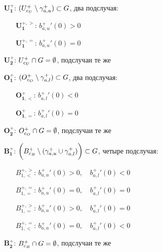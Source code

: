 \begin{enumerate}
    \item[$ \bm{U_1^+} $:] $ (U_{c_U}^+ \setminus \gamma_{a, u}^+) \subset G $, два подслучая:
    \begin{enumerate}
        \item[$ \bm{U_1^{+, >}} $:] $ b_{a, u}^+{}'(0) > 0 $
        \item[$ \bm{U_1^{+, =}} $:] $ b_{a, u}^+{}'(0) = 0 $
    \end{enumerate}
    \item[$ \bm{U_2^+} $:] $ U_{c_U}^+ \cap G = \emptyset $, подслучаи те же
    \item[$ \bm{O_1^+} $:] $ (O_{c_O}^+ \setminus \gamma_{a, l}^+) \subset G $, два подслучая:
    \begin{enumerate}
        \item[$ \bm{O_{1, <}^+} $:] $ b_{a, l}^+{}'(0) < 0 $
        \item[$ \bm{O_{1, =}^+} $:] $ b_{a, l}^+{}'(0) = 0 $
    \end{enumerate}
    \item[$ \bm{O_2^+} $:] $ O_{c_O}^+ \cap G = \emptyset $, подслучаи те же
    \item[$ \bm{B_1^+} $:] $ \bigg(B_{c_B}^+ \setminus (\gamma_{a, u}^+ \cup \gamma_{a, l}^+) \bigg) \subset G $, четыре подслучая:
    \begin{enumerate}
        \item[$ B_{1, <}^{+, >} $:] $ b_{a, u}^+{}'(0) > 0, \quad b_{a, l}^+{}'(0) < 0 $
        \item[$ B_{1, =}^{+, =} $:] $ b_{a, u}^+{}'(0) = 0, \quad b_{a, l}^+{}'(0) = 0 $
        \item[$ B_{1, =}^{+, >} $:] $ b_{a, u}^+{}'(0) > 0, \quad b_{a, l}^+{}'(0) = 0 $
        \item[$ B_{1, <}^{+, =} $:] $ b_{a, u}^+{}'(0) = 0, \quad b_{a, l}^+{}'(0) < 0 $
    \end{enumerate}
    \item[$ \bm{B_2^+} $:] $ B_{c_B}^+ \cap G = \emptyset $, подслучаи те же
\end{enumerate}

